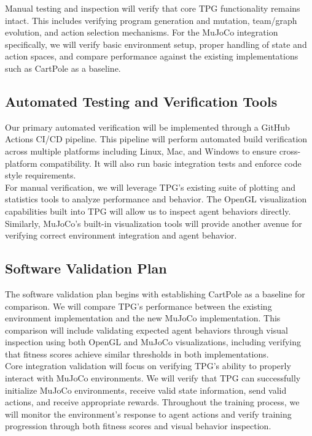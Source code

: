 \documentclass[12pt, titlepage]{article}
\begin{document}
Manual testing and inspection will verify that core TPG functionality remains intact. This includes verifying program generation and mutation, team/graph evolution, and action selection mechanisms. For the MuJoCo integration specifically, we will verify basic environment setup, proper handling of state and action spaces, and compare performance against the existing implementations such as CartPole as a baseline.

\subsection{Automated Testing and Verification Tools}

Our primary automated verification will be implemented through a GitHub Actions CI/CD pipeline. This pipeline will perform automated build verification across multiple platforms including Linux, Mac, and Windows to ensure cross-platform compatibility. It will also run basic integration tests and enforce code style requirements. \\

For manual verification, we will leverage TPG's existing suite of plotting and statistics tools to analyze performance and behavior. The OpenGL visualization capabilities built into TPG will allow us to inspect agent behaviors directly. Similarly, MuJoCo's built-in visualization tools will provide another avenue for verifying correct environment integration and agent behavior.

\subsection{Software Validation Plan}

The software validation plan begins with establishing CartPole as a baseline for comparison. We will compare TPG's performance between the existing environment implementation and the new MuJoCo implementation. This comparison will include validating expected agent behaviors through visual inspection using both OpenGL and MuJoCo visualizations, including verifying that fitness scores achieve similar thresholds in both implementations. \\

Core integration validation will focus on verifying TPG's ability to properly interact with MuJoCo environments. We will verify that TPG can successfully initialize MuJoCo environments, receive valid state information, send valid actions, and receive appropriate rewards. Throughout the training process, we will monitor the environment's response to agent actions and verify training progression through both fitness scores and visual behavior inspection. \\
\end{document}
